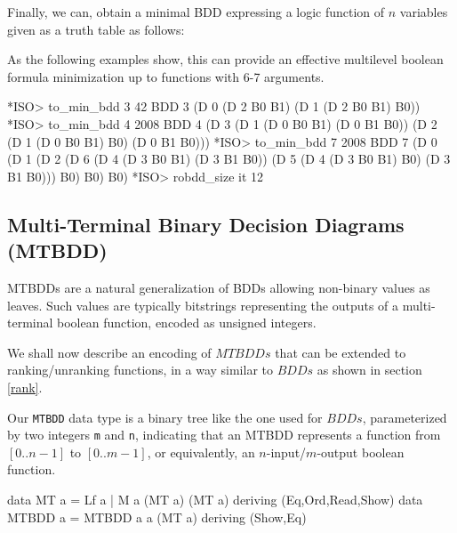 \documentclass[]{INCLUDES/llncs}
\begin{document}
Finally, we can, obtain a minimal BDD expressing a logic function of $n$
variables given as a truth table as follows:
As the following examples show, this can provide an effective 
multilevel boolean formula minimization up to functions with
6-7 arguments.
\begin{codex}
*ISO> to_min_bdd 3 42
BDD 3 (D 0 (D 2 B0 B1) (D 1 (D 2 B0 B1) B0))
*ISO> to_min_bdd 4 2008
BDD 4 (D 3 (D 1 (D 0 B0 B1) (D 0 B1 B0)) 
      (D 2 (D 1 (D 0 B0 B1) B0) (D 0 B1 B0)))
*ISO> to_min_bdd 7 2008
BDD 7 (D 0 (D 1 (D 2 (D 6 
                     (D 4 (D 3 B0 B1) (D 3 B1 B0)) 
      (D 5 (D 4 (D 3 B0 B1) B0) 
                (D 3 B1 B0))) B0) B0) B0)
*ISO> robdd_size it
12
\end{codex}

\subsection{Multi-Terminal Binary Decision Diagrams (MTBDD)} \label{multi}
MTBDDs \cite{DBLP:journals/fmsd/FujitaMY97,CBGP08} are a natural generalization
of BDDs allowing non-binary values as leaves.
Such values are typically 
bitstrings representing the outputs
of a multi-terminal boolean function,
encoded as unsigned integers.

We shall now describe an encoding of $MTBDDs$
that can be extended to ranking/unranking functions,
in a way similar to $BDDs$ as shown in section \ref{rank}.

Our {\tt MTBDD} data type is a binary tree like the one used for $BDDs$,
parameterized by two integers {\tt m} and {\tt n}, indicating
that an MTBDD represents a function from $[0..n-1]$ to $[0..m-1]$,
or equivalently, an $n$-input/$m$-output boolean function.

\begin{code}   
data MT a = Lf a | M a (MT a) (MT a) deriving (Eq,Ord,Read,Show)
data MTBDD a = MTBDD a a (MT a) deriving (Show,Eq)
\end{code}
\end{document}
